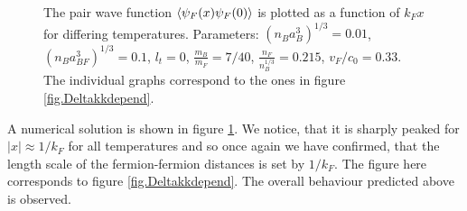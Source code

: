 \begin{figure} 
\begin{center}  
  
\caption{The pair wave function $\braket{\psi_F(x)\psi_F(0)}$ is plotted as a function of $k_Fx$ for differing temperatures. Parameters: $(n_Ba_B^3)^{1/3} = 0.01$, $(n_Ba_{BF}^3)^{1/3} = 0.1$, $l_t = 0$, $\frac{m_B}{m_F} = 7/40$, $\frac{n_F}{n_B^{1/3}} = 0.215$, $v_F/c_0 = 0.33$. The individual graphs correspond to the ones in figure \ref{fig.Deltakkdepend}. }  
\label{fig.pairwavefunction}  
\end{center}    
\end{figure}

A numerical solution is shown in figure \ref{fig.pairwavefunction}. We notice, that it is sharply peaked for $|x| \approx 1/k_F$ for all temperatures and so once again we have confirmed, that the length scale of the fermion-fermion distances is set by $1/k_F$. The figure here corresponds to figure \ref{fig.Deltakkdepend}. The overall behaviour predicted above is observed. 

